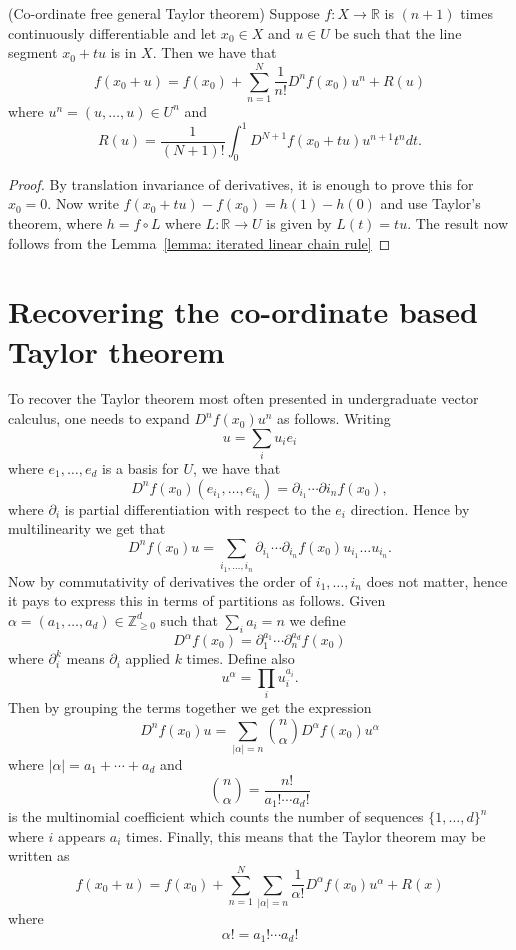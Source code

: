 \documentclass[twoside, a4paper, 10pt]{amsart}
\begin{document}
\begin{thm}(Co-ordinate free general Taylor theorem) Suppose $f:X \to \mathbb{R}$ is $(n+1)$ times continuously differentiable and let $x_0 \in X$ and $u \in U$ be such that the line segment $x_0 + tu$ is in $X$. Then we have that $$f(x_0 + u) = f(x_0) + \sum_{n=1}^N \frac{1}{n!} D^n f(x_0) u^n + R(u)$$ where $u^n = (u, \ldots, u) \in U^n$ and $$R(u) =\frac{1}{(N+1)!} \int_{0}^1 D^{N+1}f(x_0 + tu)u^{n+1} t^n dt  .$$  \end{thm}

\begin{proof} By translation invariance of derivatives, it is enough to prove this for $x_0 = 0$. Now write $f(x_0 + tu) - f(x_0) = h(1) - h(0)$ and use Taylor's theorem, where $h = f \circ L$ where $L:\mathbb{R} \to U$ is given by $L(t) = tu$. The result now follows from the Lemma~\ref{lemma: iterated linear chain rule} 
\end{proof}

\section{Recovering the co-ordinate based Taylor theorem}

To recover the Taylor theorem most often presented in undergraduate vector calculus, one needs to expand $D^nf(x_0) u^n$ as follows. Writing $$u = \sum_i u_i e_i$$ where $e_1, \ldots, e_d$ is a basis for $U$, we have that $$D^nf(x_0) (e_{i_1}, \ldots, e_{i_n}) = \partial_{i_1} \cdots \partial{i_n}f(x_0),$$ where $\partial_i$ is partial differentiation with respect to the $e_i$ direction. Hence by multilinearity we get that $$D^nf(x_0)u = \sum_{i_1, \ldots, i_n} \partial_{i_1} \cdots \partial_{i_n}f(x_0) u_{i_1} \ldots u_{i_n}.$$ Now by commutativity of derivatives the order of $i_1, \ldots, i_n$ does not matter, hence it pays to express this in terms of partitions as follows. Given $\alpha = (a_1, \ldots, a_d) \in \mathbb{Z}_{\geq 0}^d$ such that $\sum_i a_i = n$ we define $$D^{\alpha}f(x_0) = \partial_1^{a_1} \cdots \partial_n^{a_d} f(x_0)$$ where $\partial_i^{k}$ means $\partial_i$ applied $k$ times. Define also $$u^{\alpha} = \prod_{i} u_i^{a_i}.$$ Then by grouping the terms together we get the expression $$D^n f(x_0) u = \sum_{|\alpha| = n} \binom{n}{\alpha} D^{\alpha}f(x_0) u ^{\alpha}$$ where $|\alpha| = a_1 + \cdots + a_d$ and $$\binom{n}{\alpha} = \frac{n!}{a_1 ! \cdots a_d!}$$ is the multinomial coefficient which counts the number of sequences $\{1, \ldots, d\}^n$ where $i$ appears $a_i$ times. Finally, this means that the Taylor theorem may be written as $$ f(x_0 + u ) = f(x_0) + \sum_{n=1}^N \sum_{|\alpha| = n} \frac{1}{\alpha!} D^{\alpha}f(x_0) u^{\alpha}  + R(x) $$ where $$ \alpha! = a_1! \cdots a_d!$$
\end{document}
